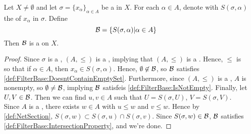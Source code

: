 \begin{prop}
    \label{prop:NetSectionsFormFilterBase}
    Let $X \neq \emptyset$
    and let $\sigma=\{x_\alpha\}_{\alpha \in A}$
    be a \Net in $X$. 
    For each 
    $\alpha \in A$, denote  with
    $S(\sigma, \alpha ) $ 
    the \NetSection of $x_\alpha$ in $\sigma$. 
    Define 
    \begin{equation*}
        \mathcal{B}=\{S(\sigma, \alpha ) | \alpha \in A\}
    \end{equation*}
    Then $\mathcal{B}$ is a \FilterBase on $X$. 
    \begin{proof}
        Since $\sigma$ is a \Net, 
        $(A,\leq)$ is a \DirectedSet, 
        implying that $(A,\leq)$ is a \PreorderedSet.
        Hence, $\leq$ is \ReflexiveRelation so that
        if $\alpha \in A$, then $x_\alpha \in S(\sigma, \alpha)$. 
        Hence, $\emptyset \not \in \mathcal{B}$, so 
        $\mathcal{B}$ satisfies 
        \ref{def:FilterBase:DoesntContainEmptySet}.
        Furthermore, since 
        $(A,\leq)$ is a \PreorderedSet, 
        $A$ is nonempty, so 
        $\emptyset \neq \mathcal{B}$, implying $\mathcal{B}$ satisfeis 
        \ref{def:FilterBase:IsNotEmpty}. 
        Finally, let $U,V \in \mathcal{B}$. 
        Then we can find $u,v \in A$ such that 
        $U = S(\sigma, U)$, $V=S(\sigma, V)$. 
        Since $A$ is a \DirectedSet, 
        there exists $w \in A$ with $u \leq w$ and $v \leq w$. 
        Hence by \ref{def:NetSection}, 
        $S(\sigma, w ) \subset S(\sigma, u) \cap S(\sigma, v)$. 
        Since $S(\sigma, w ) \in \mathcal{B}$, 
        $\mathcal{B}$ satisfies 
        \ref{def:FilterBase:IntersectionProperty}, 
        and we're done. 
    \end{proof}
\end{prop}
